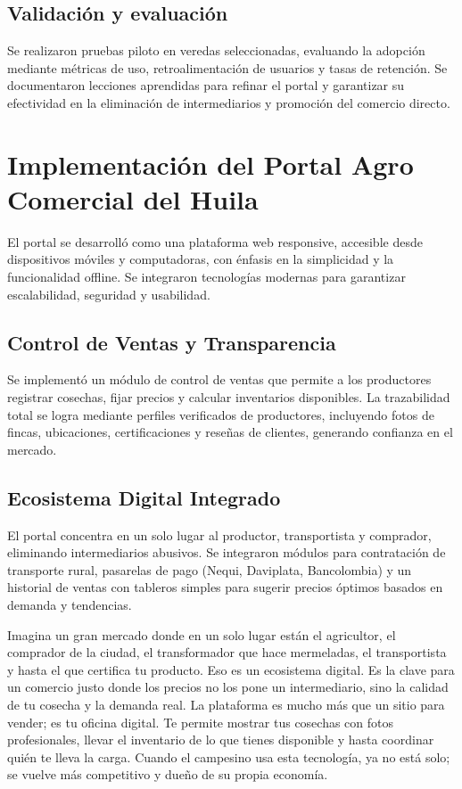 \subsection{Validación y evaluación}
Se realizaron pruebas piloto en veredas seleccionadas, evaluando la adopción mediante métricas de uso, retroalimentación de usuarios y tasas de retención. Se documentaron lecciones aprendidas para refinar el portal y garantizar su efectividad en la eliminación de intermediarios y promoción del comercio directo.

\section{Implementación del Portal Agro Comercial del Huila}

El portal se desarrolló como una plataforma web responsive, accesible desde dispositivos móviles y computadoras, con énfasis en la simplicidad y la funcionalidad offline. Se integraron tecnologías modernas para garantizar escalabilidad, seguridad y usabilidad.

\subsection{Control de Ventas y Transparencia}
Se implementó un módulo de control de ventas que permite a los productores registrar cosechas, fijar precios y calcular inventarios disponibles. La trazabilidad total se logra mediante perfiles verificados de productores, incluyendo fotos de fincas, ubicaciones, certificaciones y reseñas de clientes, generando confianza en el mercado.

\subsection{Ecosistema Digital Integrado}
El portal concentra en un solo lugar al productor, transportista y comprador, eliminando intermediarios abusivos. Se integraron módulos para contratación de transporte rural, pasarelas de pago (Nequi, Daviplata, Bancolombia) y un historial de ventas con tableros simples para sugerir precios óptimos basados en demanda y tendencias.

Imagina un gran mercado donde en un solo lugar están el agricultor, el comprador de la ciudad, el transformador que hace mermeladas, el transportista y hasta el que certifica tu producto. Eso es un ecosistema digital. Es la clave para un comercio justo donde los precios no los pone un intermediario, sino la calidad de tu cosecha y la demanda real. La plataforma es mucho más que un sitio para vender; es tu oficina digital. Te permite mostrar tus cosechas con fotos profesionales, llevar el inventario de lo que tienes disponible y hasta coordinar quién te lleva la carga. Cuando el campesino usa esta tecnología, ya no está solo; se vuelve más competitivo y dueño de su propia economía.

